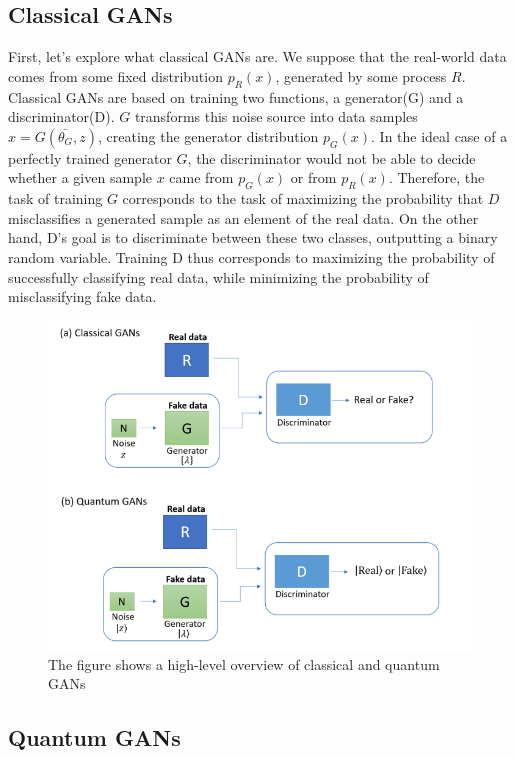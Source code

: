 \documentclass[conference]{IEEEtran}
\begin{document}
\subsection{Classical GANs}
First, let's explore what classical GANs are. We suppose that the real-world data comes
from some fixed distribution $p_{R}(x)$, generated by some process $R$. Classical GANs are based on training two functions, a generator(G) and a discriminator(D). 
$G$ transforms this noise source into data samples $x = G(\bar{\theta_{G}} , z)$, creating the generator distribution $p_{G}(x)$.
In the ideal case of a perfectly trained generator $G$, the discriminator would not be able to decide whether a given
sample $x$ came from $p_{G}(x)$ or from $p_{R}(x)$. Therefore, the task of training $G$ corresponds to the task of maximizing
the probability that $D$ misclassifies a generated sample as an element of the real data. On the other hand, D's goal is
to discriminate between these two classes, outputting a binary random variable. Training D thus corresponds to
maximizing the probability of successfully classifying real data, while minimizing the probability of misclassifying
fake data.

\begin{figure}[htbp]
\centerline{\includegraphics[scale = 0.3]{Images/gan1.png}}
\caption{The figure shows a high-level overview of classical and quantum GANs}
\label{gan1}
\end{figure}

\subsection{Quantum GANs}
\end{document}
